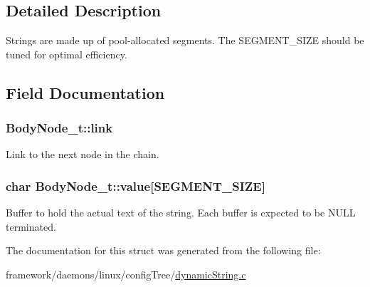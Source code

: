 \subsection{Detailed Description}
Strings are made up of pool-\/allocated segments. The S\+E\+G\+M\+E\+N\+T\+\_\+\+S\+I\+ZE should be tuned for optimal efficiency. 

\subsection{Field Documentation}
\subsubsection[{\texorpdfstring{link}{link}}]{ Body\+Node\+\_\+t\+::link}\hypertarget{struct_body_node__t_a0a22f469d330f39146ebf523b6a0c2e2}{}\label{struct_body_node__t_a0a22f469d330f39146ebf523b6a0c2e2}


Link to the next node in the chain. 

\subsubsection[{\texorpdfstring{value}{value}}]{\setlength{\rightskip}{0pt plus 5cm}char Body\+Node\+\_\+t\+::value\mbox{[}{\bf S\+E\+G\+M\+E\+N\+T\+\_\+\+S\+I\+ZE}\mbox{]}}\hypertarget{struct_body_node__t_a1dd7010ad4ec13bd0e65e7eef308e731}{}\label{struct_body_node__t_a1dd7010ad4ec13bd0e65e7eef308e731}
Buffer to hold the actual text of the string. Each buffer is expected to be N\+U\+LL terminated. 

The documentation for this struct was generated from the following file\+:\begin{DoxyCompactItemize}
\item 
framework/daemons/linux/config\+Tree/\hyperlink{dynamic_string_8c}{dynamic\+String.\+c}\end{DoxyCompactItemize}
